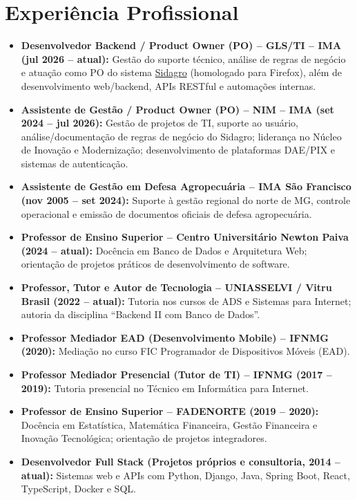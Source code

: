 \documentclass[a4paper,10pt]{article}
\begin{document}
\section*{Experiência Profissional}
\begin{itemize}[leftmargin=*]
    \item \textbf{Desenvolvedor Backend / Product Owner (PO) -- GLS/TI -- IMA (jul 2026 -- atual):} Gestão do suporte técnico, análise de regras de negócio e atuação como PO do sistema \href{https://www.sidagro.ima.mg.gov.br/sidagro/login.seam}{Sidagro} (homologado para Firefox), além de desenvolvimento web/backend, APIs RESTful e automações internas.
    \item \textbf{Assistente de Gestão / Product Owner (PO) -- NIM -- IMA (set 2024 -- jul 2026):} Gestão de projetos de TI, suporte ao usuário, análise/documentação de regras de negócio do Sidagro; liderança no Núcleo de Inovação e Modernização; desenvolvimento de plataformas DAE/PIX e sistemas de autenticação.
    \item \textbf{Assistente de Gestão em Defesa Agropecuária -- IMA São Francisco (nov 2005 -- set 2024):} Suporte à gestão regional do norte de MG, controle operacional e emissão de documentos oficiais de defesa agropecuária.
    \item \textbf{Professor de Ensino Superior -- Centro Universitário Newton Paiva (2024 -- atual):} Docência em Banco de Dados e Arquitetura Web; orientação de projetos práticos de desenvolvimento de software.
    \item \textbf{Professor, Tutor e Autor de Tecnologia -- UNIASSELVI / Vitru Brasil (2022 -- atual):} Tutoria nos cursos de ADS e Sistemas para Internet; autoria da disciplina ``Backend II com Banco de Dados''.
    \item \textbf{Professor Mediador EAD (Desenvolvimento Mobile) -- IFNMG (2020):} Mediação no curso FIC Programador de Dispositivos Móveis (EAD).
    \item \textbf{Professor Mediador Presencial (Tutor de TI) -- IFNMG (2017 -- 2019):} Tutoria presencial no Técnico em Informática para Internet.
    \item \textbf{Professor de Ensino Superior -- FADENORTE (2019 -- 2020):} Docência em Estatística, Matemática Financeira, Gestão Financeira e Inovação Tecnológica; orientação de projetos integradores.
    \item \textbf{Desenvolvedor Full Stack (Projetos próprios e consultoria, 2014 -- atual):} Sistemas web e APIs com Python, Django, Java, Spring Boot, React, TypeScript, Docker e SQL.
\end{itemize}
\end{document}
